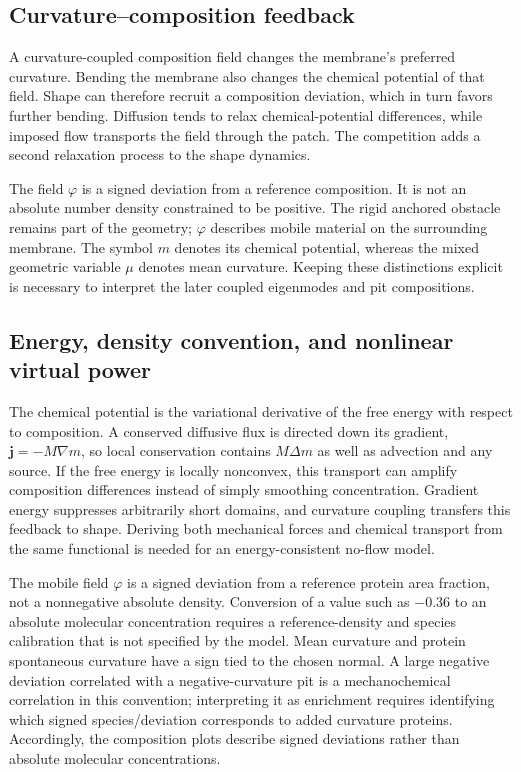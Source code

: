 \subsection{Curvature--composition feedback}
A curvature-coupled composition field changes the membrane's preferred curvature. Bending the membrane also changes the chemical potential of that field. Shape can therefore recruit a composition deviation, which in turn favors further bending. Diffusion tends to relax chemical-potential differences, while imposed flow transports the field through the patch. The competition adds a second relaxation process to the shape dynamics.

The field $\varphi$ is a signed deviation from a reference composition. It is not an absolute number density constrained to be positive. The rigid anchored obstacle remains part of the geometry; $\varphi$ describes mobile material on the surrounding membrane. The symbol $m$ denotes its chemical potential, whereas the mixed geometric variable $\mu$ denotes mean curvature. Keeping these distinctions explicit is necessary to interpret the later coupled eigenmodes and pit compositions.


\subsection{Energy, density convention, and nonlinear virtual power}


The chemical potential is the variational derivative of the free energy with respect to composition. A conserved diffusive flux is directed down its gradient, $\bm j=-M\nabla m$, so local conservation contains $M\Delta m$ as well as advection and any source. If the free energy is locally nonconvex, this transport can amplify composition differences instead of simply smoothing concentration. Gradient energy suppresses arbitrarily short domains, and curvature coupling transfers this feedback to shape. Deriving both mechanical forces and chemical transport from the same functional is needed for an energy-consistent no-flow model.


The mobile field $\varphi$ is a signed deviation from a reference protein area fraction, not a nonnegative absolute density. Conversion of a value such as $-0.36$ to an absolute molecular concentration requires a reference-density and species calibration that is not specified by the model. Mean curvature and protein spontaneous curvature have a sign tied to the chosen normal. A large negative deviation correlated with a negative-curvature pit is a mechanochemical correlation in this convention; interpreting it as enrichment requires identifying which signed species/deviation corresponds to added curvature proteins. Accordingly, the composition plots describe signed deviations rather than absolute molecular concentrations.

